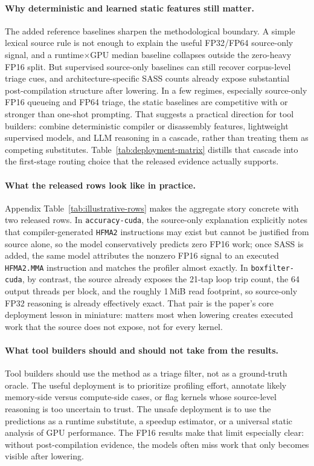 \paragraph{Why deterministic and learned static features still matter.}
The added reference baselines sharpen the methodological boundary.
A simple lexical source rule is not enough to explain the useful FP32/FP64 source-only signal, and a runtime$\times$GPU median baseline collapses outside the zero-heavy FP16 split.
But supervised source-only baselines can still recover corpus-level triage cues, and architecture-specific SASS counts already expose substantial post-compilation structure after lowering.
In a few regimes, especially source-only FP16 queueing and \sourcesass FP64 triage, the static baselines are competitive with or stronger than one-shot prompting.
That suggests a practical direction for tool builders:
combine deterministic compiler or disassembly features, lightweight supervised models, and LLM reasoning in a cascade, rather than treating them as competing substitutes.
Table~\ref{tab:deployment-matrix} distills that cascade into the first-stage routing choice that the released evidence actually supports.



\paragraph{What the released rows look like in practice.}
Appendix Table~\ref{tab:illustrative-rows} makes the aggregate story concrete with two released rows.
In \texttt{accuracy-cuda}, the source-only explanation explicitly notes that compiler-generated \texttt{HFMA2} instructions may exist but cannot be justified from source alone, so the model conservatively predicts zero FP16 work; once SASS is added, the same model attributes the nonzero FP16 signal to an executed \texttt{HFMA2.MMA} instruction and matches the profiler almost exactly.
In \texttt{boxfilter-cuda}, by contrast, the source already exposes the 21-tap loop trip count, the 64 output threads per block, and the roughly 1\,MiB read footprint, so source-only FP32 reasoning is already effectively exact.
That pair is the paper's core deployment lesson in miniature:
\sourcesass matters most when lowering creates executed work that the source does not expose, not for every kernel.

\paragraph{What tool builders should and should not take from the results.}
Tool builders should use the method as a triage filter, not as a ground-truth oracle.
The useful deployment is to prioritize profiling effort, annotate likely memory-side versus compute-side cases, or flag kernels whose source-level reasoning is too uncertain to trust.
The unsafe deployment is to use the predictions as a runtime substitute, a speedup estimator, or a universal static analysis of GPU performance.
The FP16 results make that limit especially clear: without post-compilation evidence, the models often miss work that only becomes visible after lowering.

